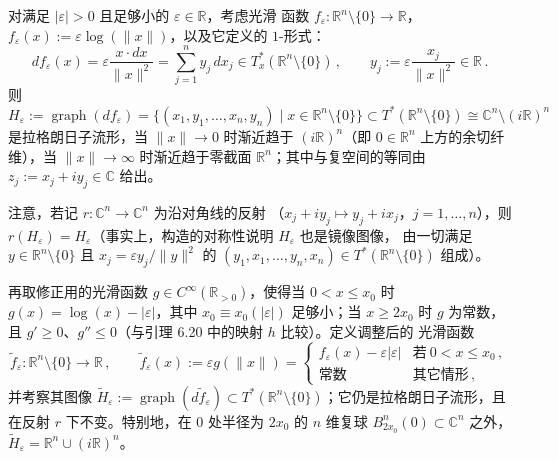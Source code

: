 \begin{Def}\label{def:6.25}
对满足 $|\varepsilon|>0$ 且足够小的 $\varepsilon\in\mathbb R$，考虑光滑
函数 $f_\varepsilon:\mathbb R^n\setminus\{0\}\to\mathbb R$，
$f_\varepsilon(x):=\varepsilon\log(\|x\|)$，以及它定义的 $1$-形式：
\[
df_\varepsilon(x)=\varepsilon\frac{x\cdot dx}{\|x\|^2}
=\sum_{j=1}^{n}y_j\,dx_j\in T^*_x(\mathbb R^n\setminus\{0\})\,,
\qquad y_j:=\varepsilon\frac{x_j}{\|x\|^2}\in\mathbb R\,.
\]
则 $H_\varepsilon:=\operatorname{graph}(df_\varepsilon)
=\{(x_1,y_1,\dots,x_n,y_n)\mid x\in\mathbb R^n\setminus\{0\}\}
\subset T^*(\mathbb R^n\setminus\{0\})\cong\mathbb C^n\setminus(i\mathbb R)^n$
是拉格朗日子流形，当 $\|x\|\to0$ 时渐近趋于 $(i\mathbb R)^n$（即
$0\in\mathbb R^n$ 上方的余切纤维），当 $\|x\|\to\infty$ 时渐近趋于零截面
$\mathbb R^n$；其中与复空间的等同由 $z_j:=x_j+iy_j\in\mathbb C$ 给出。

注意，若记 $r:\mathbb C^n\to\mathbb C^n$ 为沿对角线的反射
（$x_j+iy_j\mapsto y_j+ix_j$，$j=1,\dots,n$），则 $r(H_\varepsilon)
=H_\varepsilon$（事实上，构造的对称性说明 $H_\varepsilon$ 也是镜像图像，
由一切满足 $y\in\mathbb R^n\setminus\{0\}$ 且
$x_j=\varepsilon y_j/\|y\|^2$ 的 $(y_1,x_1,\dots,y_n,x_n)\in
T^*(\mathbb R^n\setminus\{0\})$ 组成）。

再取修正用的光滑函数 $g\in C^\infty(\mathbb R_{>0})$，使得当
$0<x\le x_0$ 时 $g(x)=\log(x)-|\varepsilon|$，其中
$x_0\equiv x_0(|\varepsilon|)$ 足够小；当 $x\ge 2x_0$ 时 $g$ 为常数，
且 $g'\ge0$、$g''\le0$（与引理 6.20 中的映射 $h$ 比较）。定义调整后的
光滑函数
\[
\tilde f_\varepsilon:\mathbb R^n\setminus\{0\}\to\mathbb R\,,\qquad
\tilde f_\varepsilon(x):=\varepsilon g(\|x\|)=
\begin{cases}
f_\varepsilon(x)-\varepsilon|\varepsilon| & \text{若}\ 0<x\le x_0\,,\\
\text{常数} & \text{其它情形}\,,
\end{cases}
\]
并考察其图像 $\tilde H_\varepsilon:=\operatorname{graph}(d\tilde f_\varepsilon)
\subset T^*(\mathbb R^n\setminus\{0\})$；它仍是拉格朗日子流形，且在反射
$r$ 下不变。特别地，在 $0$ 处半径为 $2x_0$ 的 $n$ 维复球
$B^n_{2x_0}(0)\subset\mathbb C^n$ 之外，
$\tilde H_\varepsilon=\mathbb R^n\cup(i\mathbb R)^n$。
\end{Def}


